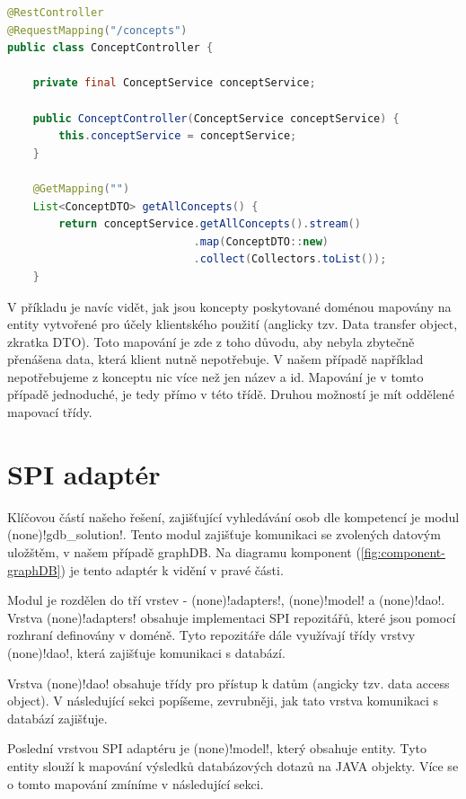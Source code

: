 \begin{lstlisting}[language=JAVA, caption= Příklad REST kontroleru pro operace s koncepty, captionpos=b]
@RestController
@RequestMapping("/concepts")
public class ConceptController {

    private final ConceptService conceptService;

    public ConceptController(ConceptService conceptService) {
        this.conceptService = conceptService;
    }

    @GetMapping("")
    List<ConceptDTO> getAllConcepts() {
        return conceptService.getAllConcepts().stream()
                             .map(ConceptDTO::new)
                             .collect(Collectors.toList());
    }
\end{lstlisting}
V příkladu je navíc vidět, jak jsou koncepty poskytované doménou mapovány na entity vytvořené pro účely klientského použití (anglicky tzv. Data transfer object, zkratka DTO). Toto mapování je zde z toho důvodu, aby nebyla zbytečně přenášena data, která klient nutně nepotřebuje. V našem případě například nepotřebujeme z konceptu nic více než jen název a id. Mapování je v tomto případě jednoduché, je tedy přímo v této třídě. Druhou možností je mít oddělené mapovací třídy.

\section{SPI adaptér}
Klíčovou částí našeho řešení, zajišťující vyhledávání osob dle kompetencí je modul \ctulst(none)!gdb_solution!. Tento modul zajišťuje komunikaci se zvolených datovým uložštěm, v našem případě graphDB. Na diagramu komponent (\ref{fig:component-graphDB}) je tento adaptér k vidění v pravé části.\par
Modul je rozdělen do tří vrstev - \ctulst(none)!adapters!, \ctulst(none)!model! a \ctulst(none)!dao!.
Vrstva \ctulst(none)!adapters! obsahuje implementaci SPI repozitářů, které jsou pomocí rozhraní definovány v doméně. Tyto repozitáře dále využívají třídy vrstvy \ctulst(none)!dao!, která zajišťuje komunikaci s databází.\par
Vrstva \ctulst(none)!dao! obsahuje třídy pro přístup k datům (angicky tzv. data access object). V následující sekci popíšeme, zevrubněji, jak tato vrstva komunikaci s databází zajišťuje.\par
Poslední vrstvou SPI adaptéru je \ctulst(none)!model!, který obsahuje entity. Tyto entity slouží k mapování výsledků databázových dotazů na JAVA objekty. Více se o tomto mapování zmíníme v následující sekci.

